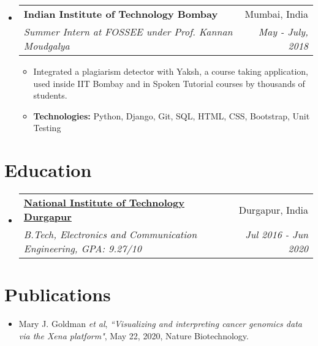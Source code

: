 \documentclass[a4paper,11pt]{article}
\makeatletter
\newcommand{\resumeSubheading}[4]{
  \vspace{-1pt}\item
    \begin{tabular*}{0.97\textwidth}[t]{l@{\extracolsep{\fill}}r}
      \textbf{#1 } & #2 \\
      \textit{\small#3} & \textit{\small #4} \\
    \end{tabular*}\vspace{-5pt}
}
\newcommand{\resumeSubHeadingListStart}{\begin{itemize}[leftmargin=*, topsep=0pt]}
\newcommand{\resumeSubHeadingListEnd}{\end{itemize}}
\newcommand{\resumeItemListStart}{\begin{itemize}}
\newcommand{\resumeItemListEnd}{\end{itemize}\vspace{-5pt}}
\makeatother
\begin{document}
  \resumeSubHeadingListStart
    \resumeSubheading
    {Indian Institute of Technology Bombay}{Mumbai, India}
    {Summer Intern at FOSSEE under Prof. Kannan Moudgalya}{May - July, 2018}
    \resumeItemListStart
      \item\small
        {Integrated a plagiarism detector with Yaksh, a course taking application, used inside IIT Bombay and in Spoken Tutorial courses by thousands of students.}
      \item\small
      {\textbf{Technologies:} Python, Django, Git, SQL, HTML, CSS, Bootstrap, Unit Testing}
    \resumeItemListEnd
  \resumeSubHeadingListEnd

\section{Education}
  \resumeSubHeadingListStart
  \resumeSubheading
      {\href{https://nitdgp.ac.in}{National Institute of Technology Durgapur}}{Durgapur, India}
      {B.Tech, Electronics and Communication Engineering, GPA: 9.27/10}{Jul 2016 - Jun 2020}
  \resumeSubHeadingListEnd


\section{Publications}
    \setlength{\itemsep}{0.5pt}
    \begin{itemize}
        \item{Mary J. Goldman \textit{et al}}, \textit{``Visualizing and interpreting cancer genomics data via the Xena platform"}, May 22, 2020, Nature Biotechnology.
    \end{itemize}
\end{document}
